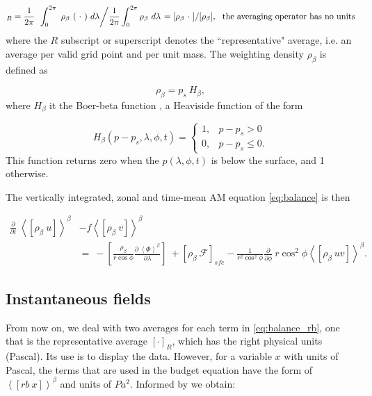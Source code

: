 \documentclass[11pt]{article}
\numberwithin{equation}{section}
\newcommand{\beq}{\begin{equation}}
\newcommand{\eeq}{\end{equation}}
\newcommand{\la}{\langle}
\newcommand{\ra}{\rangle}
\newcommand{\lara}[1]{\left\la{#1}\right\ra}
\newcommand{\cphi}{\cos \phi}
\newcommand{\rb}{\rho_\beta}
\begin{document}
\beq
[~\cdot~]_R =  \frac{1}{2 \pi} \left. ~ \int_0^ {2 \pi} ~ \rb ~ (~\cdot~) ~ d\lambda \middle/ 
\frac{1}{2 \pi}  \int_0^{2 \pi} \rb ~ d \lambda \right.  = [\rb~\cdot~]/  [\rb] ,~~ \mathtt{\text{the averaging operator has no units}}
\eeq
%
%
where the $R$ subscript or superscript denotes the ``representative" average, i.e. an average per valid grid point and per unit mass.
The weighting density $\rb$ is defined as 

$$\rb = p_s ~H_\beta,$$ 
where $H_\beta$ it the Boer-beta function \citep{Boer1982}, a Heaviside function of the form 

\beq
H_\beta(p -p_s, \lambda, \phi, t)= 
    \begin{cases}  
      1, & p -p_s >  0 \\
      0, & p -p_s \leq 0.
    \end{cases}
\eeq
This function returns zero when the $p(\lambda, \phi, t)$ is below the surface, and 1 otherwise.\par


The vertically integrated, zonal and time-mean AM equation \eqref{eq:balance} is then 

\begin{align} \label{eq:balance_rb}
\frac{\partial}{\partial t}  ~ \lara{[\rb~u]}^\beta &- f \lara{ [\rb~v]}^\beta  \nonumber  \\
  &= ~ - \left[\frac{\rb }{r \cphi} \frac{\partial~\lara{\Phi}^\beta  }{\partial \lambda}  \right]
 ~+ [\rb ~ \mathcal{F}]_{sfc}  - \frac{1}{r^2 \cos^2{\phi}}  \frac{\partial}{\partial \phi}  ~ r \cos^2{\phi} \lara{ [ \rb ~u v] }^\beta.
\end{align}

\subsection{Instantaneous fields}
From now on, we deal with two averages for each term in \eqref{eq:balance_rb}, one that is the representative average $[\cdot]_R$, which has the right physical units (Pascal). Its use is to display the data. However, for a variable $x$ with units of Pascal, the terms that are used in the budget equation have the form of $\lara{[rb ~x ]}^\beta$ and units of $Pa^2$. Informed by \citet[Table 1,][]{Boer1982} we obtain:
\end{document}
